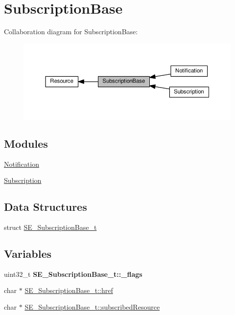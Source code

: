 \hypertarget{group__SubscriptionBase}{}\section{Subscription\+Base}
\label{group__SubscriptionBase}
Collaboration diagram for Subscription\+Base\+:\nopagebreak
\begin{figure}[H]
\begin{center}
\leavevmode
\includegraphics[width=350pt]{group__SubscriptionBase}
\end{center}
\end{figure}
\subsection*{Modules}
\begin{DoxyCompactItemize}
\item 
\hyperlink{group__Notification}{Notification}
\item 
\hyperlink{group__Subscription}{Subscription}
\end{DoxyCompactItemize}
\subsection*{Data Structures}
\begin{DoxyCompactItemize}
\item 
struct \hyperlink{structSE__SubscriptionBase__t}{S\+E\+\_\+\+Subscription\+Base\+\_\+t}
\end{DoxyCompactItemize}
\subsection*{Variables}
\begin{DoxyCompactItemize}
\item 
\mbox{\label{group__SubscriptionBase_gacb5f5f74f0249244f1ff2bd98757a08a}} 
uint32\+\_\+t {\bfseries S\+E\+\_\+\+Subscription\+Base\+\_\+t\+::\+\_\+flags}
\item 
char $\ast$ \hyperlink{group__SubscriptionBase_ga397ee2afb88c8687bccb35b3acec3490}{S\+E\+\_\+\+Subscription\+Base\+\_\+t\+::href}
\item 
char $\ast$ \hyperlink{group__SubscriptionBase_ga20d85c9e20b561f7f7d7aa3b337c0e4f}{S\+E\+\_\+\+Subscription\+Base\+\_\+t\+::subscribed\+Resource}
\end{DoxyCompactItemize}


